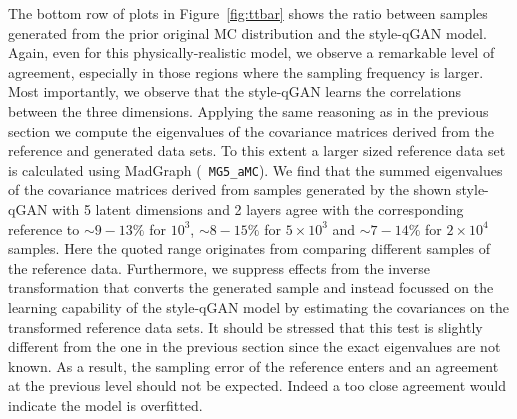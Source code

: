 \documentclass[twocolumn,preprintnumbers,superscriptaddress]{revtex4-2}
\begin{document}

%
The bottom row of plots in Figure~\ref{fig:ttbar} shows the ratio between
samples generated from the prior original MC distribution and the style-qGAN
model. Again, even for this physically-realistic model, we observe a remarkable level of agreement, especially in those regions where the sampling frequency is larger. Most importantly, we observe that the style-qGAN learns
the correlations between the three dimensions. 
%
Applying the same reasoning as in the previous section we compute the eigenvalues of the covariance matrices derived from the reference and generated data sets. To this extent a larger sized reference data set is calculated using MadGraph ({\tt
MG5\_aMC}). We find that the summed eigenvalues of the covariance matrices derived from samples generated by the shown style-qGAN with 5 latent dimensions and 2 layers agree with the corresponding reference to $\sim 9-13\%$ for $10^3$, $\sim 8-15\%$ for $5\times10^3$ and $\sim 7-14\%$ for $2\times10^4$ samples. Here the quoted range originates from comparing different samples of the reference data. Furthermore, we suppress effects from the inverse transformation that converts the generated sample and instead focussed on the learning capability of the style-qGAN model by estimating the covariances on the transformed reference data sets.
%
It should be stressed that this test is slightly different from the one in the previous section since the exact eigenvalues are not known. As a result, the sampling error of the reference enters and an agreement at the previous level should not be expected. Indeed a too close agreement would indicate the model is overfitted.  
 
\end{document}
